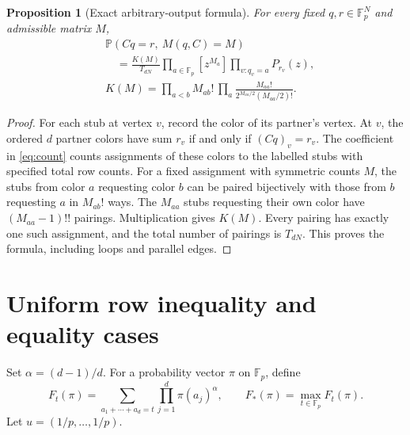 \documentclass[11pt]{article}
\newtheorem{proposition}{Proposition}
\newcommand{\Fp}{\mathbb F_p}
\newcommand{\Prob}{\mathbb P}
\begin{document}
\begin{proposition}[Exact arbitrary-output formula]\label{prop:exact}
For every fixed $q,r\in\Fp^N$ and admissible matrix $M$,
\begin{align}
 &\Prob(Cq=r,\ M(q,C)=M)\\
 &\quad=\frac{K(M)}{T_{dN}}
       \prod_{a\in\Fp}[z^{M_a}]
              \prod_{v:q_v=a}P_{r_v}(z),\label{eq:count}\\
 &K(M)=\prod_{a<b} M_{ab}!\,
         \prod_a\frac{M_{aa}!}{2^{M_{aa}/2}(M_{aa}/2)!}.
 \nonumber
\end{align}
\end{proposition}
\begin{proof}
For each stub at vertex $v$, record the color of its partner's vertex.
At $v$, the ordered $d$ partner colors have sum $r_v$ if and only if
$(Cq)_v=r_v$. The coefficient in \eqref{eq:count} counts assignments of
these colors to the labelled stubs with specified total row counts.
For a fixed assignment with symmetric counts $M$, the stubs from color
$a$ requesting color $b$ can be paired bijectively with those from $b$
requesting $a$ in $M_{ab}!$ ways. The $M_{aa}$ stubs requesting their own
color have $(M_{aa}-1)!!$ pairings. Multiplication gives $K(M)$.
Every pairing has exactly one such assignment, and the total number of
pairings is $T_{dN}$. This proves the formula, including loops and
parallel edges.
\end{proof}

\section{Uniform row inequality and equality cases}
Set $\alpha=(d-1)/d$. For a probability vector $\pi$ on $\Fp$, define
\[
 F_t(\pi)=\sum_{a_1+\cdots+a_d=t}\prod_{j=1}^d\pi(a_j)^\alpha,
 \qquad F_*(\pi)=\max_{t\in\Fp}F_t(\pi).
\]
Let $u=(1/p,\ldots,1/p)$.
\end{document}
